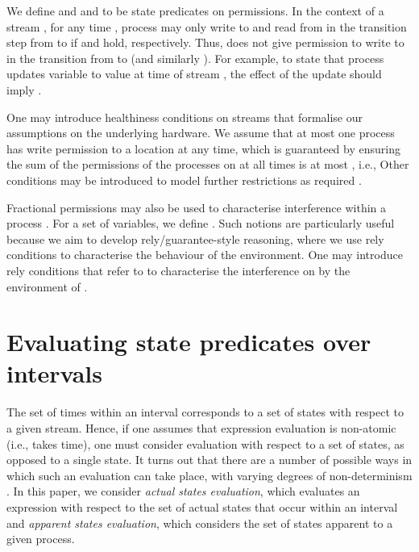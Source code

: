 \documentclass{article}
\theoremstyle{plain}
\theoremstyle{definition}
\begin{document}
We define  and
 and  to be state predicates on permissions.
In the context of a stream , for any time , process
 may only write to and read from  in the transition step from
 to  if  and  hold,
respectively. Thus,  does not give  permission to write to 
in the transition from  to  (and similarly ).
For example, to state that process  updates variable  to value
 at time  of stream , the effect of the update should imply
.

One may introduce healthiness conditions on streams that formalise our
assumptions on the underlying hardware. We assume that at most one
process has write permission to a location  at any time, which is
guaranteed by ensuring the sum of the permissions of the processes on
 at all times is at most , i.e.,  Other
conditions may be introduced to model further restrictions as required
\cite{DDH12}.

Fractional permissions may also be used to characterise interference
within a process . For a set of variables, we define . Such notions are particularly useful because we aim to develop
rely/guarantee-style reasoning, where we use rely conditions to
characterise the behaviour of the environment. One may introduce rely
conditions that refer to  to characterise the interference
on  by the environment of .



\section{Evaluating state predicates over intervals}
\label{sec:eval-state-pred}

The set of times within an interval corresponds to a set of states
with respect to a given stream. Hence, if one assumes that expression
evaluation is non-atomic (i.e., takes time), one must consider
evaluation with respect to a set of states, as opposed to a single
state. It turns out that there are a number of possible ways in which
such an evaluation can take place, with varying degrees of
non-determinism \cite{HBDJ13}. In this paper, we consider \emph{actual
  states evaluation}, which evaluates an expression with respect to
the set of actual states that occur within an interval and
\emph{apparent states evaluation}, which considers the set of states
apparent to a given process.
\end{document}
